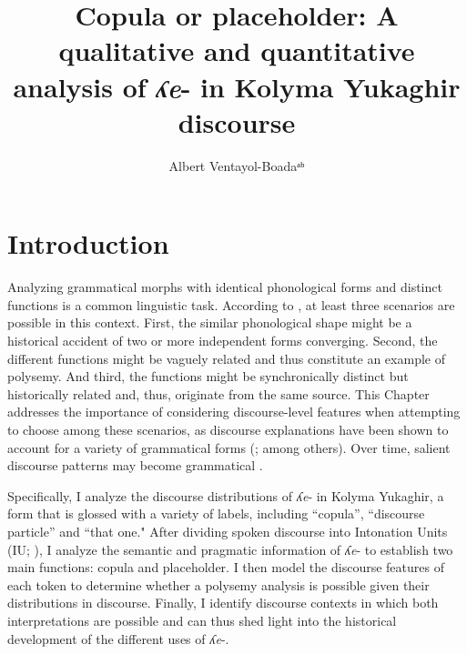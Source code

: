 \documentclass[output=paper,colorlinks,citecolor=brown
\ChapterDOI{10.5281/zenodo.15697581}
]{langscibook}
\author{Albert Ventayol-Boadaᵃᵇ\affiliation{ᵃUniversity of California, Santa Barbara  ᵇCurrent affiliation: Meta AI}}
\title{Copula or placeholder: A qualitative and quantitative analysis of \textit{ʎe}- in Kolyma Yukaghir discourse}
\begin{document}
\maketitle
{}

\graphicspath{{figures/ventayol_boada}}


\section{Introduction} \label{sec_intro}

Analyzing grammatical morphs with identical phonological forms and distinct functions is a common linguistic task. 
According to \citet{Epps2008a}, at least three scenarios are possible in this context. 
First, the similar phonological shape might be a historical accident of two or more independent forms converging.
Second, the different functions might be vaguely related and thus constitute an example of polysemy. 
And third, the functions might be synchronically distinct but historically related and, thus, originate from the same source. 
This Chapter addresses the importance of considering discourse-level features when attempting to choose among these scenarios, as discourse explanations have been shown to account for a variety of grammatical forms (\citealt{Chafe1976, Clark&FoxTree2002, Davis2017, Diver1982, DuBois1987, Fox&Thompson1990, Hopper&Thompson1980, Mithun2008, Ono-et-al2000, Sankoff&Brown1976, Stern2006, Thompson&Mulac1991}; among others). 
Over time, salient discourse patterns may become grammatical \citep{Ariel2009, Couper-Kuhlen&Thompson2008, DuBois2003}. 

Specifically, I analyze the discourse distributions of \textit{ʎe}- in Kolyma Yukaghir, a form that is glossed with a variety of labels, including ``copula'', ``discourse particle'' and ``that one." 
After dividing spoken discourse into Intonation Units (IU; \citealt{Chafe1979, Chafe1992}), I analyze the semantic and pragmatic information of \textit{ʎe}- to establish two main functions: copula and placeholder. 
I then model the discourse features of each token to determine whether a polysemy analysis is possible given their distributions in discourse. 
Finally, I identify discourse contexts in which both interpretations are possible and can thus shed light into the historical development of the different uses of \textit{ʎe}-.
\end{document}
